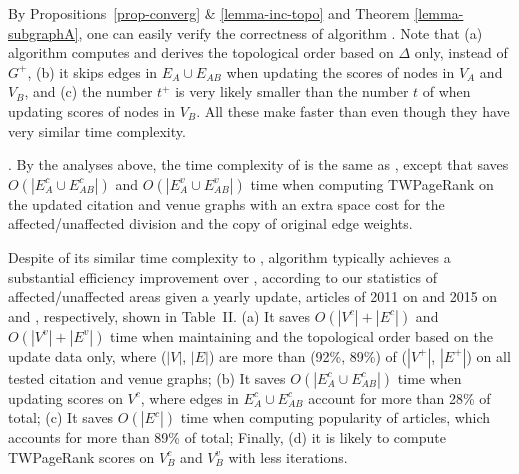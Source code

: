 
By Propositions~\ref{prop-converg} \& \ref{lemma-inc-topo} and Theorem \ref{lemma-subgraphA}, one can easily verify the correctness of algorithm \inctwprscc.
%
Note that  (a) algorithm \inctwprscc computes \sccs and derives the topological order based  on $\Delta$ only, instead of $G^{+}$,
(b) it skips edges in $E_A\cup E_{AB}$ when updating the scores of nodes in $V_A$ and $V_B$, and
(c) the number $t^+$ is very likely smaller than the number $t$ of \twprscc when updating scores of nodes in $V_B$.
%
All these make \inctwprscc faster than \twprscc even though they have very similar time complexity.


.
By the analyses above, the time complexity of \incensemble is the same as \batensemble, except that \incensemble saves $O(|E^c_A\cup E^c_{AB}|)$ and $O(|E^v_A\cup E^v_{AB}|)$ time when computing TWPageRank  on the updated citation and venue graphs with an extra space cost for the affected/unaffected division and the copy of original edge weights.


Despite of its similar time complexity to \batensemble, algorithm \incensemble typically achieves a substantial efficiency improvement over \batensemble, according to our statistics of affected/unaffected areas given a yearly update, \ie articles of 2011 on \aan and 2015 on \aminer and \magdata, respectively, shown in Table~II.
%
(a) It saves $O(|V^c|+|E^c|)$ and $O(|V^v|+|E^v|)$ time when maintaining \sccs and the topological order based on the update data only,
where ($|V|$, $|E|$) are more than (92\%, 89\%) of ($|V^{+}|$, $|E^{+}|$) on all tested citation and venue graphs;
(b) It saves $O(|E^c_A \cup E^c_{AB}|)$ time when updating scores on $V^c$, where edges in $E^c_A\cup E^c_{AB}$ account for more than 28\% of total;
(c) It saves $O(|E^c|)$ time when computing popularity of articles, which accounts for more than 89\% of total;
Finally, (d) it is likely to compute TWPageRank scores on $V^c_B$ and $V^v_B$ with less iterations.



